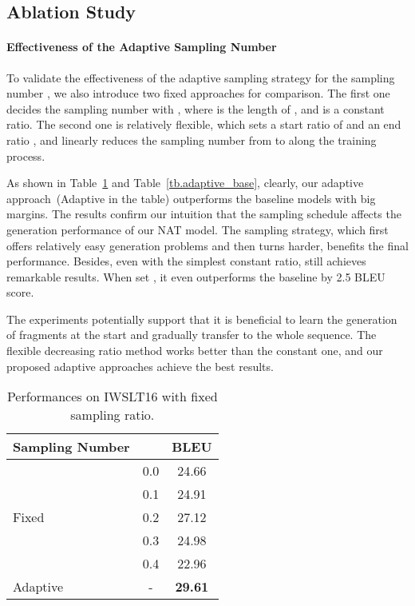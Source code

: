 \subsection{Ablation Study}


\paragraph{Effectiveness of the Adaptive Sampling Number}
To validate the effectiveness of the adaptive sampling strategy for the sampling number , we also introduce two fixed approaches for comparison. The first one decides the sampling number with , where  is the length of , and  is a constant ratio. The second one is relatively flexible,  which sets a start ratio of  and an end ratio , and linearly reduces the sampling number from  to  along the training process.

As shown in Table~\ref{tb.constant_base} and Table~\ref{tb.adaptive_base}, clearly, our adaptive approach~(Adaptive in the table) outperforms the baseline models with big margins. The results confirm our intuition that the sampling schedule affects the generation performance of our NAT model.
The sampling strategy, which first offers relatively easy generation problems and then turns harder, benefits the final performance.
Besides, even with the simplest constant ratio, \method still achieves remarkable results. When set , it even outperforms the baseline  by 2.5 BLEU score.

The experiments potentially support that it is beneficial to learn the generation of fragments at the start and gradually transfer to the whole sequence. The flexible decreasing ratio method works better than the constant one, and our proposed adaptive approaches achieve the best results.

\begin{table}[!tbp]
\centering
\small
\begin{tabular}{lcc}
\toprule
Sampling Number &    & BLEU \\
\midrule
\multirow{5}{*}{Fixed}  & 0.0  & 24.66  \\
                        & 0.1  & 24.91 \\
                        & 0.2  & 27.12  \\
                        & 0.3  & 24.98  \\
                        & 0.4  & 22.96  \\
\midrule
Adaptive                & -  & \textbf{29.61}  \\
\bottomrule
\end{tabular}
\caption{Performances on IWSLT16 with fixed sampling ratio.}
\label{tb.constant_base}
\end{table}



